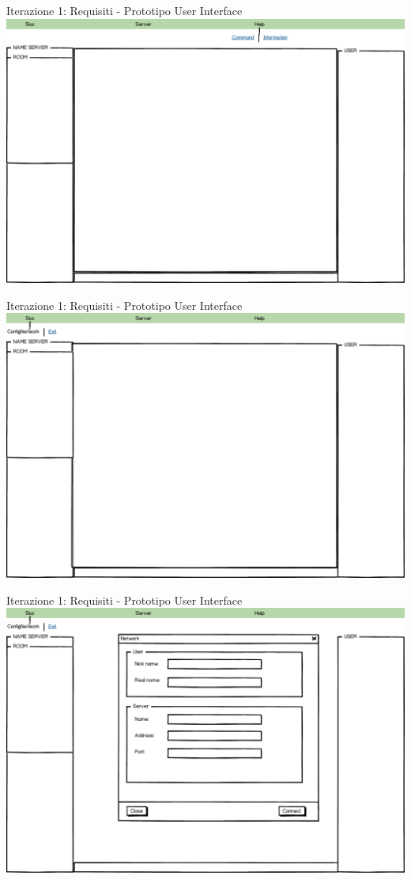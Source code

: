 \begin{frame} {Iterazione 1: Requisiti - Prototipo User Interface}
    \includegraphics[scale=0.28]{image_mockups/03_snuc_menu_help.png}{\centering}
\end{frame}

\begin{frame} {Iterazione 1: Requisiti - Prototipo User Interface}
    \includegraphics[scale=0.28]{image_mockups/04_snuc_menu_snuc.png}{\centering}
\end{frame}

\begin{frame} {Iterazione 1: Requisiti - Prototipo User Interface}
    \includegraphics[scale=0.28]{image_mockups/05_snuc_config_network.png}{\centering}
\end{frame}

